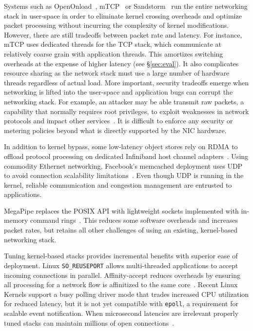  Systems such as
OpenOnload~\cite{openonload}, mTCP~\cite{jeong2014mtcp} or
Sandstorm~\cite{sandstorm} run the entire networking stack in
user-space in order to eliminate kernel crossing overheads and
optimize packet processing without incurring the complexity of kernel
modifications. However, there are still tradeoffs between packet rate
and latency. For instance, mTCP uses dedicated threads for the TCP
stack, which communicate at relatively coarse grain with application
threads. This amortizes switching overheads at the expense of higher
latency (see \S\ref{sec:eval}). It also complicates resource sharing
as the network stack must use a large number of hardware threads
regardless of actual load. More important, security tradeoffs emerge
when networking is lifted into the user-space and application bugs can
corrupt the networking stack. For example, an attacker may be able
transmit raw packets, a capability that normally requires root
privileges, to exploit weaknesses in network protocols and impact
other services~\cite{DBLP:conf/acsac/Bellovin04}. It is difficult to
enforce any security or metering policies beyond what is directly
supported by the NIC hardware.

 In addition to kernel bypass, some
low-latency object stores rely on RDMA to offload protocol processing
on dedicated Infiniband host channel
adapters~\cite{dragojevic14farm,DBLP:conf/icpp/JoseSLZHWIOWSP11,mitchell:rdma,DBLP:conf/sosp/OngaroRSOR11}.
 Using commodity Ethernet
networking, Facebook's memcached deployment uses UDP to avoid
connection scalability
limitations~\cite{DBLP:conf/nsdi/NishtalaFGKLLMPPSSTV13}. Even though
UDP is running in the kernel, reliable communication and congestion
management are entrusted to applications.

 MegaPipe replaces the POSIX
API with lightweight sockets implemented with in-memory command
rings~\cite{DBLP:conf/osdi/HanMCR12}. This reduces some
software overheads and increases packet rates, but retains all other
challenges of using an existing, kernel-based networking stack.

 Tuning kernel-based stacks provides
incremental benefits with superior ease of deployment.  Linux
\texttt{SO\_REUSEPORT} allows multi-threaded applications to accept
incoming connections in parallel. Affinity-accept reduces overheads by
ensuring all processing for a network flow is affinitized to the same
core~\cite{DBLP:conf/eurosys/PesterevSZM12}. Recent Linux Kernels
support a busy polling driver mode that trades increased CPU utilization
for reduced latency, but it is not yet compatible with
\texttt{epoll}, a requirement for scalable event notification.
When microsecond latencies are
irrelevant properly tuned stacks can maintain millions of open
connections~\cite{whatsapp-2mil}.


